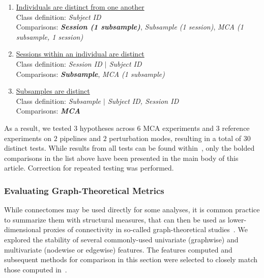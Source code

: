 \documentclass[10pt,letterpaper]{article}
\begin{document}
\begin{enumerate}[label=$H_{A\arabic*}$:]
\item \underline{Individuals are distinct from one another}\\
Class definition: \textit{Subject ID}\\
Comparisons: \textbf{\textit{Session (1 subsample)}}, \textit{Subsample (1 session)},
\textit{MCA (1 subsample, 1 session)}
\item \underline{Sessions within an individual are distinct}\\
Class definition: \textit{Session ID $\vert$ Subject ID}\\
Comparisons: \textbf{\textit{Subsample}}, \textit{MCA (1 subsample)}
\item \underline{Subsamples are distinct}\\
Class definition: \textit{Subsample $\vert$ Subject ID, Session ID}\\
Comparisons: \textbf{\textit{MCA}}
\end{enumerate}

As a result, we tested $3$ hypotheses across $6$ MCA experiments and $3$ reference
experiments on $2$ pipelines and $2$ perturbation modes, resulting in a total of
$30$ distinct tests. While results from all tests can be found
within~, only the bolded comparisons in the list above
have been presented in the main body of this article. Correction for repeated
testing was performed.

\subsubsection*{Evaluating Graph-Theoretical Metrics}
While connectomes may be used directly for some analyses, it is common practice to
summarize them with structural measures, that can then be used as lower-dimensional
proxies of connectivity in so-called graph-theoretical studies~\cite{Rubinov2010-fh}. 
We explored the stability of several commonly-used univariate (graphwise) and
multivariate (nodewise or edgewise) features. The features computed and subsequent
methods for comparison in this section were selected to closely match those computed
in~\cite{Betzel2018-eo}.
\end{document}
